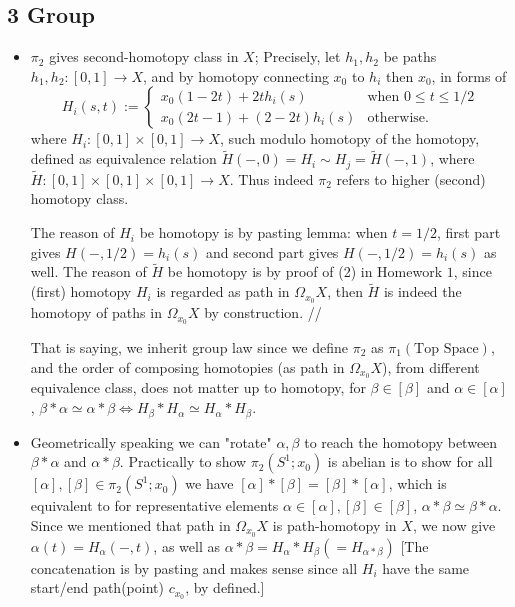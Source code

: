 \documentclass[11pt]{article}
\theoremstyle{remark}
\begin{document}
\newpage
\subsection*{3 Group }
\begin{itemize}
    \item $\pi_2$ gives second-homotopy class in $X$; 
    Precisely, let $h_1,h_2$ be paths $h_1,h_2:[0,1]\rightarrow X$, and by homotopy connecting $x_0$ to $h_i$ then $x_0$, in forms of 
    \[
    H_i(s,t):= \begin{cases} x_0(1-2t)+2th_i(s) & \text{when } 0\leq t \leq 1/2 \\ x_0(2t-1)+(2-2t)h_i(s) & \text{otherwise.} \end{cases}
    \]
    where $H_i: [0,1]\times[0,1] \rightarrow X$, such modulo homotopy of the homotopy, defined as equivalence relation $\tilde{H}(-,0)=H_i \sim H_j=\tilde{H}(-,1) $, where $ \tilde{H}: [0,1]\times[0,1]\times[0,1]\rightarrow X$. 
    Thus indeed $\pi_2$ refers to higher (second) homotopy class.  
    
    The reason of $H_i$ be homotopy is by pasting lemma: when $t=1/2$, first part gives $H(-,1/2)=h_i(s)$ and second part gives $H(-,1/2)=h_i(s)$ as well. The reason of $\tilde{H}$ be homotopy is by proof of (2) in Homework $1$, since (first) homotopy $H_i$ is regarded as path in $\Omega_{x_0}X$, then $\tilde{H}$ is indeed the homotopy of paths in $\Omega_{x_0}X$  by construction. //
    
    That is saying, we inherit group law since we define $\pi_2$ as $\pi_1(\textrm{Top Space})$, and the order of composing homotopies (as path in $\Omega_{x_0}X$), from different equivalence class, does not matter up to homotopy, for $\beta \in [\beta]$ and $\alpha \in [\alpha]$, $\beta \ast \alpha \simeq \alpha \ast \beta \Leftrightarrow H_\beta \ast H_\alpha \simeq H_\alpha \ast H_\beta $.
    
    \item Geometrically speaking we can "rotate" $\alpha,\beta$ to reach the homotopy between $\beta \ast \alpha$ and $\alpha \ast \beta$. Practically to show $\pi_2(S^1;x_0) $ is abelian is to show for all $[\alpha],[\beta] \in \pi_2(S^1;x_0)$ we have $[\alpha]\ast[\beta] = [\beta]\ast[\alpha]$, which is equivalent to for representative elements $\alpha \in[\alpha],[\beta] \in[\beta]$, $\alpha \ast \beta \simeq \beta \ast \alpha$. Since we mentioned that path in $\Omega_{x_0}X$ is path-homotopy in $X$, we now give $\alpha(t)=H_\alpha(-,t)$, as well as $\alpha \ast \beta= H_\alpha \ast H_\beta(= H_{\alpha \ast \beta})$ [The concatenation is by pasting and makes sense since all $H_i$ have the same start/end path(point) $c_{x_0}$, by defined.]
    

\end{itemize}
\end{document}
